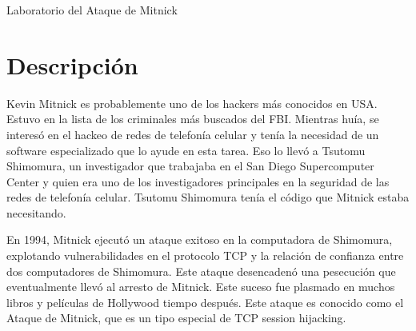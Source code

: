 
\newcommand{\commonfolder}{../../common-files}





\newcommand{\mitnickFigs}{./Figs}

\newcommand{\rsh}{\texttt{rsh}\xspace}





\begin{center}
{\LARGE  Laboratorio del Ataque de Mitnick}
\end{center}



\section{Descripción}

Kevin Mitnick es probablemente uno de los hackers más conocidos en USA.
Estuvo en la lista de los criminales más buscados del FBI. Mientras huía, se interesó en el hackeo de redes de telefonía celular y tenía la necesidad de un software especializado que lo ayude en esta tarea. Eso lo llevó a Tsutomu Shimomura, un investigador que trabajaba en el San Diego Supercomputer Center y quien era uno de los investigadores principales en la seguridad de las redes de telefonía celular.
Tsutomu Shimomura tenía el código que Mitnick estaba necesitando.

En 1994, Mitnick ejecutó un ataque exitoso en la computadora de Shimomura, explotando vulnerabilidades en el protocolo TCP y la relación de confianza entre dos computadores de Shimomura. Este ataque desencadenó una pesecución que eventualmente llevó al arresto de Mitnick. Este suceso fue plasmado en muchos libros y películas de Hollywood tiempo después.
Este ataque es conocido como el Ataque de Mitnick, que es un tipo especial de TCP session hijacking.


